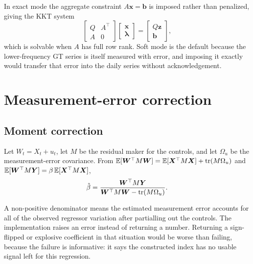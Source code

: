 \documentclass[12pt,a4paper,oneside]{article}
\begin{document}
In exact mode the aggregate constraint $A\bm{x}=\bm{b}$ is imposed rather than
penalized, giving the KKT system
\begin{equation}
\begin{bmatrix} Q & A^\top\\ A & 0\end{bmatrix}
\begin{bmatrix}\bm{x}\\ \bm{\lambda}\end{bmatrix}
=
\begin{bmatrix}Q\bm{z}\\ \bm{b}\end{bmatrix},
\end{equation}
which is solvable when $A$ has full row rank. Soft mode is the default because
the lower-frequency GT series is itself measured with error, and imposing it
exactly would transfer that error into the daily series without acknowledgement.

\section{Measurement-error correction}\label{app:eiv}

\subsection{Moment correction}\label{app:moment}

Let $W_t=X_t+u_t$, let $M$ be the residual maker for the controls, and let
$\Omega_u$ be the measurement-error covariance. From
$\mathbb{E}[\bm{W}^\top M\bm{W}]=\mathbb{E}[\bm{X}^\top M\bm{X}]+\operatorname{tr}(M\Omega_u)$ and
$\mathbb{E}[\bm{W}^\top M\bm{Y}]=\beta\,\mathbb{E}[\bm{X}^\top M\bm{X}]$,
\begin{equation}
\hat{\beta}=\frac{\bm{W}^\top M\bm{Y}}
{\bm{W}^\top M\bm{W}-\operatorname{tr}(M\Omega_u)}.
\end{equation}

\begin{remark}
A non-positive denominator means the estimated measurement error accounts for
all of the observed regressor variation after partialling out the controls. The
implementation raises an error instead of returning a number. Returning a
sign-flipped or explosive coefficient in that situation would be worse than
failing, because the failure is informative: it says the constructed index has
no usable signal left for this regression.
\end{remark}
\end{document}
